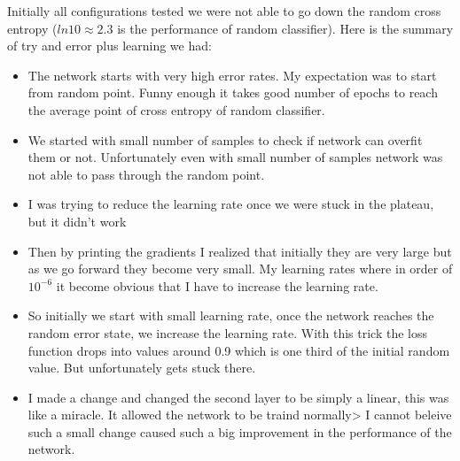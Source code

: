 Initially all configurations tested we were not able to go down the random cross entropy ($ln 10 \approx 2.3 $  is the performance of random classifier).  Here is the summary of try and error plus learning we had: 

\begin{itemize}
    \item The network starts with very high error rates. My expectation was to start from random point. Funny enough it takes good number of epochs to reach the average point of cross entropy of random classifier. 
    \item We started with small number of samples to check if network can overfit them or not. Unfortunately even with small number of samples network was not able to pass through the random point. 
    \item I was trying to reduce the  learning rate once we were stuck in the plateau, but it didn't work 
    \item Then by printing the gradients I realized that initially they are very large but as we go forward they become very small. My learning rates where in order of $10^{-6}$  it become obvious that I have to increase the learning rate. 
    \item So initially we start with small learning rate, once the network reaches the random error state, we increase the learning rate.  With this trick the loss function drops into values  around 0.9 which is one third of the initial random value. But unfortunately gets stuck there. 
    \item  I made a change and changed the second layer to be simply a linear, this was like a miracle. It allowed the network to be traind normally> I cannot beleive such a small change caused such a big improvement in the performance of the network.
\end{itemize}